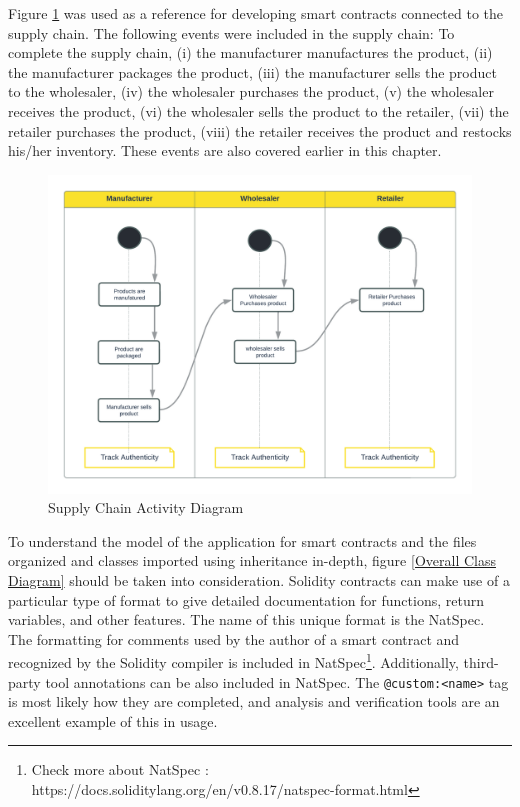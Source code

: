 \vspace{.5cm}

Figure \ref{Activity Diagram} was used as a reference for developing smart contracts connected to the supply chain. The following events were included in the supply chain: To complete the supply chain, (i) the manufacturer manufactures the product, (ii) the manufacturer packages the product, (iii) the manufacturer sells the product to the wholesaler, (iv) the wholesaler purchases the product, (v) the wholesaler receives the product, (vi) the wholesaler sells the product to the retailer, (vii) the retailer purchases the product, (viii) the retailer receives the product and restocks his/her inventory. These events are also covered earlier in this chapter.

\begin{figure}[h]
\centering
  \includegraphics[width=12cm]{includes/figures/Activity Diagram.png} 
  \caption{Supply Chain Activity Diagram}
  \label{Activity Diagram}
\end{figure}

\vspace{.5cm}

To understand the model of the application for smart contracts and the files organized and classes imported using inheritance in-depth, figure \ref{Overall Class Diagram} should be taken into consideration. Solidity contracts can make use of a particular type of format to give detailed documentation for functions, return variables, and other features. The name of this unique format is the \ac{NatSpec}. The formatting for comments used by the author of a smart contract and recognized by the Solidity compiler is included in \ac{NatSpec}\footnote{Check more about NatSpec : https://docs.soliditylang.org/en/v0.8.17/natspec-format.html}. Additionally, third-party tool annotations can be also included in \ac{NatSpec}. The \texttt{@custom:<name>} tag is most likely how they are completed, and analysis and verification tools are an excellent example of this in usage.

